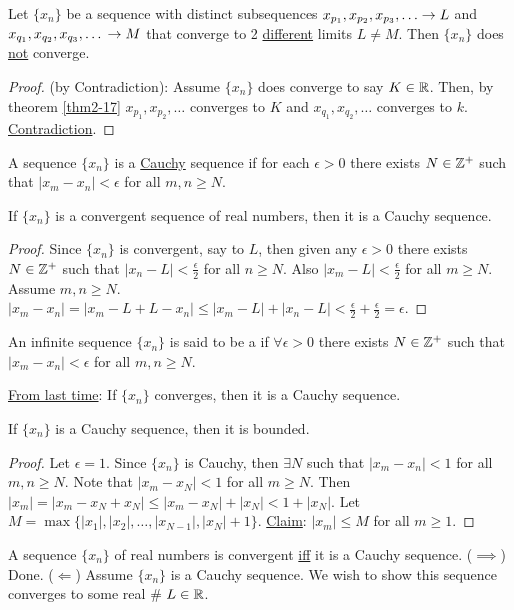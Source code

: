 \documentclass[]{article}
\begin{document}
\begin{theorem}
	Let $\{x_n\}$ be a sequence with distinct subsequences $x_{p_1},x_{p_2},x_{p_3},\dots \ra L$ and $x_{q_1},x_{q_2},x_{q_3},\dots \\\rightarrow M$ that converge to 2 \ul{different} limits $L\neq M$. Then $\{x_n\}$ does \ul{not} converge.
\end{theorem}
\begin{proof}
	(by Contradiction): Assume $\{x_n\}$ does converge to say $K\in\mathbb{R}$. Then, by theorem \ref{thm2-17} $x_{p_1},x_{p_2},\dots$ converges to $K$ and $x_{q_1},x_{q_2},\dots$ converges to $k$. \ul{Contradiction}.
\end{proof}

\begin{definition}
	A sequence $\{x_n\}$ is a \ul{Cauchy} sequence if for each $\epsilon>0$ there exists $N\in\mathbb{Z}^+$ such that $|x_m-x_n|<\epsilon$ for all $m,n\geq N$.
\end{definition}
\begin{theorem}
	If $\{x_n\}$ is a convergent sequence of real numbers, then it is a Cauchy sequence.
\end{theorem}
\begin{proof}
	Since $\{x_n\}$ is convergent, say to $L$, then given any $\epsilon>0$ there exists $N\in\mathbb{Z}^+$ such that $|x_n - L|<\frac{\epsilon}{2}$ for all $n\geq N$. Also $|x_m-L|<\frac{\epsilon}{2}$ for all $m\geq N$. 
	Assume $m,n\geq N$. $|x_m - x_n| = |x_m-L + L - x_n| \leq |x_m-L| + |x_n-L| < \frac{\epsilon}{2} + \frac{\epsilon}{2} = \epsilon$.
\end{proof}
\begin{recall}
	An infinite sequence $\{x_n\}$ is said to be a  if $\forall \epsilon>0$ there exists $N\in\mathbb{Z}^+$ such that $|x_m-x_n|<\epsilon$ for all $m,n\geq N$.
\end{recall}
\ul{From last time}: If $\{x_n\}$ converges, then it is a Cauchy sequence.
\begin{lemma}
	If $\{x_n\}$ is a Cauchy sequence, then it is bounded.
\end{lemma}
\begin{proof}
	Let $\epsilon=1$. Since $\{x_n\}$ is Cauchy, then $\exists N$ such that $|x_m-x_n|<1$ for all $m,n\geq N$.
	Note that $|x_m-x_N|<1$ for all $m\geq N$. Then $|x_m| = |x_m-x_N+x_N| \leq |x_m-x_N| + |x_N| < 1+ |x_N|$. Let $M = \max{\{|x_1|,|x_2|,\dots,|x_{N-1}|,|x_N|+1\}}$. \ul{Claim}: $|x_m|\leq M$ for all $m\geq 1$.
\end{proof}
\begin{theorem}
	A sequence $\{x_n\}$ of real numbers is convergent \ul{iff} it is a Cauchy sequence. ($\implies$) Done.
	($\Longleftarrow$) Assume $\{x_n\}$ is a Cauchy sequence. We wish to show this sequence converges to some real \# $L\in\mathbb{R}$.
\end{theorem}
\end{document}
